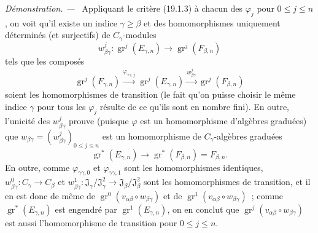 \documentclass[10pt,oneside]{book}
\newcommand{\gr}{\operatorname{gr}}
\newenvironment{proof}{%
  \par\medskip\noindent\textit{Démonstration. ---\ }}{\par}
\begin{document}
\begin{proof}
Appliquant le critère (19.1.3) à chacun des $\varphi_j$ pour $0\leq j\leq n$,
on voit qu'il existe un indice $\gamma\geq\beta$ et des homomorphismes
uniquement déterminés (et surjectifs) de $C_\gamma$-modules
\[
  w_{\beta\gamma}^j:\gr^j(E_{\gamma,n})\longrightarrow
  \gr^j(F_{\beta,n})
\]
tels que les composés
\[
  \gr^j(F_{\gamma,n})
  \xrightarrow{\varphi_{\gamma\gamma,j}}\gr^j(E_{\gamma,n})
  \xrightarrow{w_{\beta\gamma}^j}\gr^j(F_{\beta,n})
\]
soient les homomorphismes de transition (le fait qu'on puisse choisir le même
indice $\gamma$ pour tous les $\varphi_j$ résulte de ce qu'ils sont en nombre
fini). En outre, l'unicité des $w_{\beta\gamma}^j$ prouve (puisque $\varphi$ est
un homomorphisme d'algèbres graduées) que
$w_{\beta\gamma}=(w_{\beta\gamma}^j)_{0\leq j\leq n}$ est un homomorphisme de
$C_\gamma$-algèbres graduées
\[
  \gr^*(E_{\gamma,n})\longrightarrow
  \gr^*(F_{\beta,n})=F_{\beta,n}.
\]
En outre, comme $\varphi_{\gamma\gamma,0}$ et $\varphi_{\gamma\gamma,1}$ sont
les homomorphismes identiques,
$w_{\beta\gamma}^0:C_\gamma\to C_\beta$ et
$w_{\beta\gamma}^1:\mathfrak J_\gamma/\mathfrak J_\gamma^2
\to\mathfrak J_\beta/\mathfrak J_\beta^2$ sont les homomorphismes de
transition, et il en est donc de même de
$\gr^0(v_{\alpha\beta}\circ w_{\beta\gamma})$ et de
$\gr^1(v_{\alpha\beta}\circ w_{\beta\gamma})$~; comme
$\gr^*(E_{\gamma,n})$ est engendré par $\gr^1(E_{\gamma,n})$, on en conclut que
$\gr^j(v_{\alpha\beta}\circ w_{\beta\gamma})$ est aussi l'homomorphisme de
transition pour $0\leq j\leq n$.


\end{proof}
\end{document}
